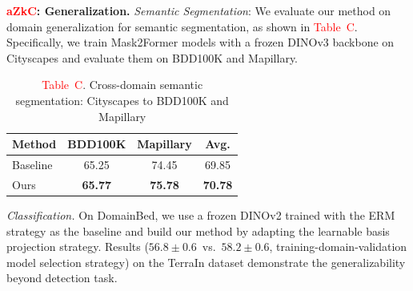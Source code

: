 \documentclass[10pt,twocolumn,letterpaper]{article}
\begin{document}
\noindent\textbf{\textcolor{red}{aZkC}: Generalization.}
\textit{Semantic Segmentation}: We evaluate our method on domain generalization for {semantic segmentation}, as shown in 
\textcolor{red}{Table~C}.
Specifically, we train Mask2Former models with a frozen DINOv3 backbone on Cityscapes and evaluate them on BDD100K and Mapillary.
\begin{table}[ht]
\vspace{-16pt}
\centering
\footnotesize 
\caption*{\textcolor{red}{Table~C}. Cross-domain semantic segmentation: Cityscapes to BDD100K and Mapillary}
\vspace{-10pt}
\begin{tabular}{lccc}
\toprule
\textbf{Method} & \textbf{BDD100K} & \textbf{Mapillary} & \textbf{Avg.} \\
\midrule
Baseline & 65.25 & 74.45 & 69.85 \\
Ours     & \textbf{65.77} & \textbf{75.78} & \textbf{70.78} \\
\bottomrule
\end{tabular}
\vspace{-12pt}
\label{tab:segmentation_results}
\end{table}



\noindent\textit{Classification.} On DomainBed, we use a frozen DINOv2 trained with the ERM strategy as the baseline and build our method by adapting the learnable basis projection strategy. Results ($56.8 \pm 0.6$~vs.~$\mathbf{58.2 \pm 0.6}$, training-domain-validation model selection strategy) on the TerraIn dataset demonstrate the generalizability beyond detection task.




















%     
%     
\end{document}
